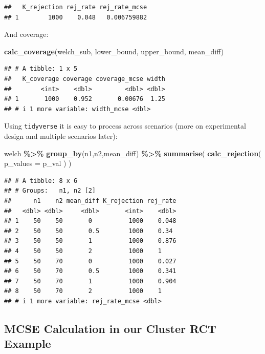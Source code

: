 \documentclass[
]{book}
\newenvironment{Shaded}{\begin{snugshade}}{\end{snugshade}}
\newcommand{\AttributeTok}[1]{\textcolor[rgb]{0.13,0.29,0.53}{#1}}
\newcommand{\FunctionTok}[1]{\textcolor[rgb]{0.13,0.29,0.53}{\textbf{#1}}}
\newcommand{\NormalTok}[1]{#1}
\newcommand{\SpecialCharTok}[1]{\textcolor[rgb]{0.81,0.36,0.00}{\textbf{#1}}}
\begin{document}
\begin{verbatim}
##   K_rejection rej_rate rej_rate_mcse
## 1        1000    0.048   0.006759882
\end{verbatim}

And coverage:

\begin{Shaded}
\begin{Highlighting}[]
\FunctionTok{calc\_coverage}\NormalTok{(welch\_sub, lower\_bound, upper\_bound, mean\_diff)}
\end{Highlighting}
\end{Shaded}

\begin{verbatim}
## # A tibble: 1 x 5
##   K_coverage coverage coverage_mcse width
##        <int>    <dbl>         <dbl> <dbl>
## 1       1000    0.952       0.00676  1.25
## # i 1 more variable: width_mcse <dbl>
\end{verbatim}

Using \texttt{tidyverse} it is easy to process across scenarios (more on experimental design and multiple scenarios later):

\begin{Shaded}
\begin{Highlighting}[]
\NormalTok{welch }\SpecialCharTok{\%\textgreater{}\%} \FunctionTok{group\_by}\NormalTok{(n1,n2,mean\_diff) }\SpecialCharTok{\%\textgreater{}\%}
  \FunctionTok{summarise}\NormalTok{( }\FunctionTok{calc\_rejection}\NormalTok{( }\AttributeTok{p\_values =}\NormalTok{ p\_val ) )}
\end{Highlighting}
\end{Shaded}

\begin{verbatim}
## # A tibble: 8 x 6
## # Groups:   n1, n2 [2]
##      n1    n2 mean_diff K_rejection rej_rate
##   <dbl> <dbl>     <dbl>       <int>    <dbl>
## 1    50    50       0          1000    0.048
## 2    50    50       0.5        1000    0.34 
## 3    50    50       1          1000    0.876
## 4    50    50       2          1000    1    
## 5    50    70       0          1000    0.027
## 6    50    70       0.5        1000    0.341
## 7    50    70       1          1000    0.904
## 8    50    70       2          1000    1    
## # i 1 more variable: rej_rate_mcse <dbl>
\end{verbatim}

\subsection{MCSE Calculation in our Cluster RCT Example}\label{mcse-calculation-in-our-cluster-rct-example}
\end{document}

